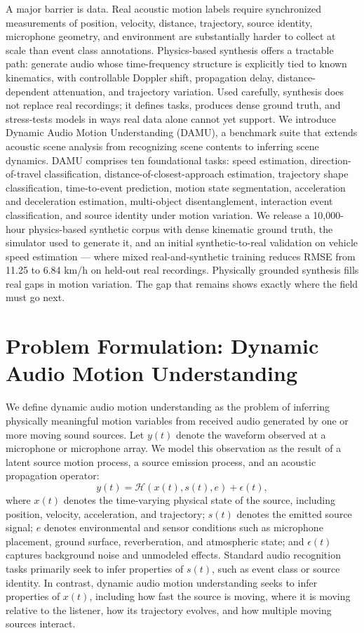 \documentclass{article}
\begin{document}
A major barrier is data. Real acoustic motion labels require synchronized measurements of position, velocity, distance, trajectory, source identity, microphone geometry, and environment are substantially harder to collect at scale than event class annotations. Physics-based synthesis offers a tractable path: generate audio whose time-frequency structure is explicitly tied to known kinematics, with controllable Doppler shift, propagation delay, distance-dependent attenuation, and trajectory variation. Used carefully, synthesis does not replace real recordings; it defines tasks, produces dense ground truth, and stress-tests models in ways real data alone cannot yet support.
We introduce Dynamic Audio Motion Understanding (DAMU), a benchmark suite that extends acoustic scene analysis from recognizing scene contents to inferring scene dynamics. DAMU comprises ten foundational tasks: speed estimation, direction-of-travel classification, distance-of-closest-approach estimation, trajectory shape classification, time-to-event prediction, motion state segmentation, acceleration and deceleration estimation, multi-object disentanglement, interaction event classification, and source identity under motion variation. We release a 10,000-hour physics-based synthetic corpus with dense kinematic ground truth, the simulator used to generate it, and an initial synthetic-to-real validation on vehicle speed estimation — where mixed real-and-synthetic training reduces RMSE from 11.25 to 6.84 km/h on held-out real recordings. Physically grounded synthesis fills real gaps in motion variation. The gap that remains shows exactly where the field must go next.

\section{Problem Formulation: Dynamic Audio Motion Understanding}

We define dynamic audio motion understanding as the problem of inferring physically meaningful motion variables from received audio generated by one or more moving sound sources. Let \(y(t)\) denote the waveform observed at a microphone or microphone array. We model this observation as the result of a latent source motion process, a source emission process, and an acoustic propagation operator:
\[
y(t) = \mathcal{H}(x(t), s(t), e) + \epsilon(t),
\]
where \(x(t)\) denotes the time-varying physical state of the source, including position, velocity, acceleration, and trajectory; \(s(t)\) denotes the emitted source signal; \(e\) denotes environmental and sensor conditions such as microphone placement, ground surface, reverberation, and atmospheric state; and \(\epsilon(t)\) captures background noise and unmodeled effects. Standard audio recognition tasks primarily seek to infer properties of \(s(t)\), such as event class or source identity. In contrast, dynamic audio motion understanding seeks to infer properties of \(x(t)\), including how fast the source is moving, where it is moving relative to the listener, how its trajectory evolves, and how multiple moving sources interact.
\end{document}
